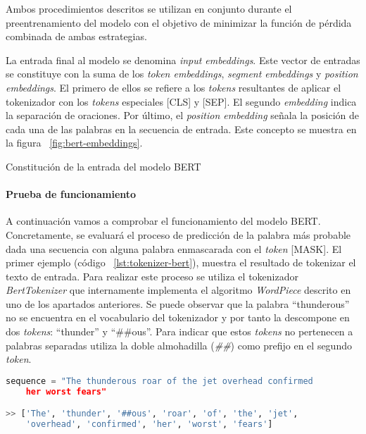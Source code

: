 Ambos procedimientos descritos se utilizan en conjunto durante el preentrenamiento del modelo con el objetivo de minimizar la función de pérdida combinada de ambas estrategias.

La entrada final al modelo se denomina \textit{input embeddings}. Este vector de entradas se constituye con la suma de los \textit{token embeddings}, \textit{segment embeddings} y \textit{position embeddings}. El primero de ellos se refiere a los \textit{tokens} resultantes de aplicar el tokenizador con los \textit{tokens} especiales [CLS] y [SEP]. El segundo \textit{embedding} indica la separación de oraciones. Por último, el \textit{position embedding} señala la posición de cada una de las palabras en la secuencia de entrada. Este concepto se muestra en la figura ~\ref{fig:bert-embeddings}.


%
{Constitución de la entrada del modelo BERT}



\paragraph{Prueba de funcionamiento}\hfill

A continuación vamos a comprobar el funcionamiento del modelo BERT. Concretamente, se evaluará el proceso de predicción de la palabra más probable dada una secuencia con alguna palabra enmascarada con el \textit{token} [MASK]. El primer ejemplo (código ~\ref{lst:tokenizer-bert}), muestra el resultado de tokenizar el texto de entrada. Para realizar este proceso se utiliza el tokenizador \textit{BertTokenizer} que internamente implementa el algoritmo \textit{WordPiece} descrito en uno de los apartados anteriores. Se puede observar que la palabra ``thunderous'' no se encuentra en el vocabulario del tokenizador y por tanto la descompone en dos \textit{tokens}: ``thunder'' y ``\#\#ous''. Para indicar que estos \textit{tokens} no pertenecen a palabras separadas utiliza la doble almohadilla (\textit{\#\#}) como prefijo en el segundo \textit{token}.

\begin{lstlisting}[language=Python, caption=Resultado de aplicar \textit{BertTokenizer} a un texto de entrada, label={lst:tokenizer-bert}]
	sequence = "The thunderous roar of the jet overhead confirmed 
	her worst fears"

>> ['The', 'thunder', '##ous', 'roar', 'of', 'the', 'jet', 
	'overhead', 'confirmed', 'her', 'worst', 'fears']
\end{lstlisting} 

